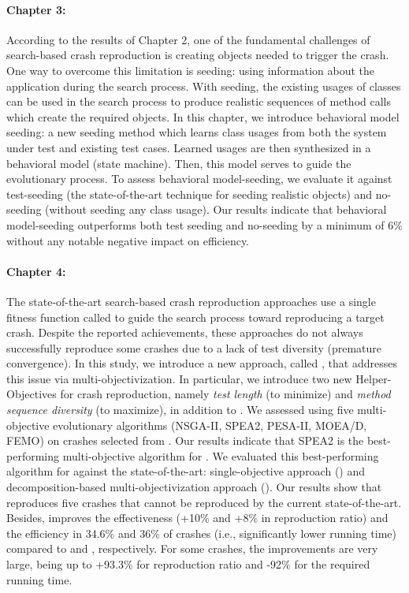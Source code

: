 \paragraph{Chapter 3:}%
According to the results of Chapter 2, one of the fundamental challenges of search-based crash reproduction is creating objects needed to trigger the crash. One way to overcome this limitation is seeding: using information about the application during the search process. With seeding, the existing usages of classes can be used in the search process to produce realistic sequences of method calls which create the required objects. In this chapter, we introduce behavioral model seeding: a new seeding method which learns class usages from both the system under test and existing test cases.  Learned usages are then synthesized in a behavioral model (state machine). Then, this model serves to guide the evolutionary process. To assess behavioral model-seeding, we evaluate it against test-seeding (the state-of-the-art technique for seeding realistic objects) and no-seeding (without seeding any class usage). 
Our results indicate that behavioral model-seeding outperforms both test seeding and no-seeding by a minimum of 6\% without any notable negative impact on efficiency.


\paragraph{Chapter 4:}%
The state-of-the-art search-based crash reproduction approaches use a single fitness function called \CrashFunction to guide the search process toward reproducing a target crash. Despite the reported achievements, these approaches do not always successfully reproduce some crashes due to a lack of test diversity (premature convergence). In this study, we introduce a new approach, called \moho, that addresses this issue via multi-objectivization. In particular, we introduce two new Helper-Objectives for crash reproduction, namely \textit{test length} (to minimize) and \textit{method sequence diversity} (to maximize), in addition to \CrashFunction.
We assessed \moho using five multi-objective evolutionary algorithms (NSGA-II, SPEA2, PESA-II, MOEA/D, FEMO) on crashes selected from \crashpack. Our results indicate that SPEA2 is the best-performing multi-objective algorithm for \moho.
We evaluated this best-performing algorithm for \moho against the state-of-the-art: single-objective approach (\SGGA) and decomposition-based multi-objectivization approach (\decomposition). Our results show that \moho reproduces five crashes that cannot be reproduced by the current state-of-the-art. Besides, \moho improves the effectiveness (+10\% and +8\% in reproduction ratio) and the efficiency in 34.6\% and 36\% of crashes (i.e., significantly lower running time) compared to  \SGGA and \decomposition, respectively. For some crashes, the improvements are very large, being up to +93.3\% for reproduction ratio and -92\% for the required running time. 

